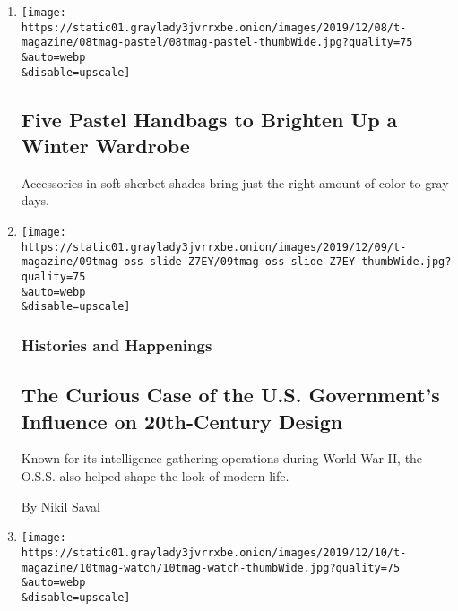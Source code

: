 \begin{enumerate}
\def\labelenumi{\arabic{enumi}.}
\item
  \href{/2019/12/11/t-magazine/pastel-handbags.html}{}

  \texttt{[image: https://static01.graylady3jvrrxbe.onion/images/2019/12/08/t-magazine/08tmag-pastel/08tmag-pastel-thumbWide.jpg?quality=75\\\&auto=webp\\\&disable=upscale]}

  \hypertarget{five-pastel-handbags-to-brighten-up-a-winter-wardrobe}{%
  \subsection{Five Pastel Handbags to Brighten Up a Winter
  Wardrobe}\label{five-pastel-handbags-to-brighten-up-a-winter-wardrobe}}

  Accessories in soft sherbet shades bring just the right amount of
  color to gray days.
\item
  \href{/2019/12/11/t-magazine/us-government-20th-century-design.html}{}

  \texttt{[image: https://static01.graylady3jvrrxbe.onion/images/2019/12/09/t-magazine/09tmag-oss-slide-Z7EY/09tmag-oss-slide-Z7EY-thumbWide.jpg?quality=75\\\&auto=webp\\\&disable=upscale]}

  \hypertarget{histories-and-happenings}{%
  \subsubsection{Histories and
  Happenings}\label{histories-and-happenings}}

  \hypertarget{the-curious-case-of-the-us-governments-influence-on-20th-century-design}{%
  \subsection{The Curious Case of the U.S. Government's Influence on
  20th-Century
  Design}\label{the-curious-case-of-the-us-governments-influence-on-20th-century-design}}

  Known for its intelligence-gathering operations during World War II,
  the O.S.S. also helped shape the look of modern life.

  By Nikil Saval
\item
  \href{/2019/12/10/t-magazine/vacheron-constantin-watch.html}{}

  \texttt{[image: https://static01.graylady3jvrrxbe.onion/images/2019/12/10/t-magazine/10tmag-watch/10tmag-watch-thumbWide.jpg?quality=75\\\&auto=webp\\\&disable=upscale]}


\end{enumerate}
